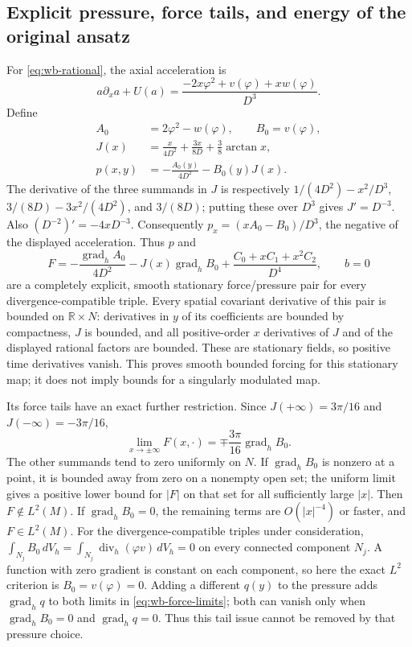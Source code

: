 \subsection{Explicit pressure, force tails, and energy of the original ansatz}
For \eqref{eq:wb-rational}, the axial acceleration is
\[
 a\partial_xa+U(a)
 =\frac{-2x\varphi^2+v(\varphi)+xw(\varphi)}{D^3}.
\]
Define
\begin{align}
 A_0&=2\varphi^2-w(\varphi),\qquad B_0=v(\varphi),\\
 J(x)&=\frac{x}{4D^2}+\frac{3x}{8D}+\frac38\arctan x,\\
 p(x,y)&=-\frac{A_0(y)}{4D^2}-B_0(y)J(x).
 \label{eq:wb-explicit-pressure}
\end{align}
The derivative of the three summands in $J$ is respectively
$1/(4D^2)-x^2/D^3$, $3/(8D)-3x^2/(4D^2)$, and $3/(8D)$;
putting these over $D^3$ gives $J'=D^{-3}$.
Also $(D^{-2})'=-4xD^{-3}$. Consequently
$p_x=(xA_0-B_0)/D^3$, the negative of the displayed acceleration.
Thus $p$ and
\begin{equation}\label{eq:wb-explicit-force}
 F=-\frac{\operatorname{grad}_h A_0}{4D^2}
   -J(x)\operatorname{grad}_h B_0
   +\frac{C_0+xC_1+x^2C_2}{D^4},\qquad b=0
\end{equation}
are a completely explicit, smooth stationary force/pressure pair for
every divergence-compatible triple. Every spatial covariant derivative
of this pair is bounded on $\mathbb R\times N$: derivatives in $y$
of its coefficients are bounded by compactness, $J$ is bounded,
and all positive-order $x$ derivatives of $J$ and of the displayed
rational factors are bounded. These are stationary fields, so positive
time derivatives vanish. This proves smooth bounded forcing for this
stationary map; it does not imply bounds for a singularly modulated map.

Its force tails have an exact further restriction. Since
$J(+\infty)=3\pi/16$ and $J(-\infty)=-3\pi/16$,
\begin{equation}\label{eq:wb-force-limits}
 \lim_{x\to\pm\infty}F(x,\cdot)
 =\mp\frac{3\pi}{16}\operatorname{grad}_h B_0.
\end{equation}
The other summands tend to zero uniformly on $N$. If
$\operatorname{grad}_hB_0$ is nonzero at a point, it is bounded away
from zero on a nonempty open set; the uniform limit gives a positive
lower bound for $|F|$ on that set for all sufficiently large $|x|$.
Then $F\notin L^2(M)$. If $\operatorname{grad}_hB_0=0$, the remaining
terms are $O(|x|^{-4})$ or faster, and $F\in L^2(M)$.
For the divergence-compatible triples under consideration,
$\int_{N_j}B_0\,dV_h=\int_{N_j}\operatorname{div}_h(\varphi v)\,dV_h=0$
on every connected component $N_j$. A function with zero gradient is
constant on each component, so here the exact $L^2$ criterion is
$B_0=v(\varphi)=0$.
Adding a different $q(y)$ to the pressure adds $\operatorname{grad}_h q$
to both limits in \eqref{eq:wb-force-limits}; both can vanish only
when $\operatorname{grad}_hB_0=0$ and $\operatorname{grad}_hq=0$.
Thus this tail issue cannot be removed by that pressure choice.

